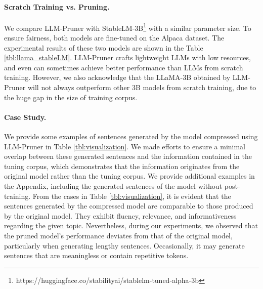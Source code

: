 \paragraph{Scratch Training vs. Pruning.} We compare LLM-Pruner with StableLM-3B\footnote{https://huggingface.co/stabilityai/stablelm-tuned-alpha-3b} with a similar parameter size. To ensure fairness, both models are fine-tuned on the Alpaca dataset. The experimental results of these two models are shown in the Table \ref{tbl:llama_stableLM}. 
LLM-Pruner crafts lightweight LLMs with low resources, and even can sometimes achieve better performance than LLMs from scratch training. However, we also acknowledge that the LLaMA-3B obtained by LLM-Pruner will not always outperform other 3B models from scratch training, due to the huge gap in the size of training corpus.  

\begin{table}[h]
    \centering
    \caption{Scratch Training (StableLM-3B) vs. LLaMA-3B (by LLM-Pruner)} \label{tbl:llama_stableLM}
    \vspace{-3mm}
\end{table}

\paragraph{Case Study.} We provide some examples of sentences generated by the model compressed using LLM-Pruner in Table \ref{tbl:visualization}. We made efforts to ensure a minimal overlap between these generated sentences and the information contained in the tuning corpus, which demonstrates that the information originates from the original model rather than the tuning corpus. We provide additional examples in the Appendix, including the generated sentences of the model without post-training. From the cases in Table \ref{tbl:visualization}, it is evident that the sentences generated by the compressed model are comparable to those produced by the original model. They exhibit fluency, relevance, and informativeness regarding the given topic. Nevertheless, during our experiments, we observed that the pruned model's performance deviates from that of the original model, particularly when generating lengthy sentences. Occasionally, it may generate sentences that are meaningless or contain repetitive tokens.

